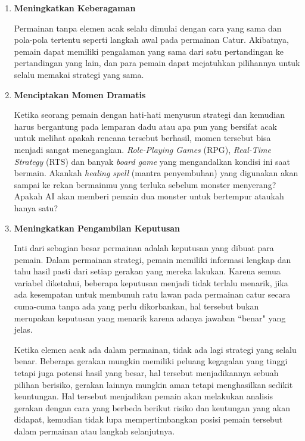 \begin{subs}
\begin{enumerate}[label=\textbf{\alph*).}]
		\item \textbf{Meningkatkan Keberagaman}
	
		Permainan tanpa elemen acak selalu dimulai dengan cara yang sama dan pola-pola tertentu seperti langkah awal pada permainan Catur. Akibatnya, pemain dapat memiliki pengalaman yang sama dari satu pertandingan ke pertandingan yang lain, dan para pemain dapat mejatuhkan pilihannya untuk selalu memakai strategi yang sama.
		\vspace{1ex}
	
		\item \textbf{Menciptakan Momen Dramatis}
	
		Ketika seorang pemain dengan hati-hati menyusun strategi dan kemudian harus bergantung pada lemparan dadu atau apa pun yang bersifat acak untuk melihat apakah rencana tersebut berhasil, momen tersebut bisa menjadi sangat menegangkan. \textit{Role-Playing Games} (RPG), \textit{Real-Time Strategy} (RTS) dan banyak \textit{board game} yang mengandalkan kondisi ini saat bermain. Akankah \textit{healing spell} (mantra penyembuhan) yang digunakan akan sampai ke rekan bermainmu yang terluka sebelum monster menyerang? Apakah AI akan memberi pemain dua monster untuk bertempur ataukah hanya satu?
		\vspace{1ex}
	
		\item \textbf{Meningkatkan Pengambilan Keputusan}
	
		Inti dari sebagian besar permainan adalah keputusan yang dibuat para pemain. Dalam permainan strategi, pemain memiliki informasi lengkap dan tahu hasil pasti dari setiap gerakan yang mereka lakukan. Karena semua variabel diketahui, beberapa keputusan menjadi tidak terlalu menarik, jika ada kesempatan untuk membunuh ratu lawan pada permainan catur secara cuma-cuma tanpa ada yang perlu dikorbankan, hal tersebut bukan merupakan keputusan yang menarik karena adanya jawaban ``benar" yang jelas.
		\vspace{1ex}
	
		Ketika elemen acak ada dalam permainan, tidak ada lagi strategi yang selalu benar. Beberapa gerakan mungkin memiliki peluang kegagalan yang tinggi tetapi juga potensi hasil yang besar, hal tersebut menjadikannya sebuah pilihan berisiko, gerakan lainnya mungkin aman tetapi menghasilkan sedikit keuntungan. Hal tersebut menjadikan pemain akan melakukan analisis gerakan dengan cara yang berbeda berikut risiko dan keutungan yang akan didapat, kemudian tidak lupa mempertimbangkan posisi pemain tersebut dalam permainan atau langkah selanjutnya.
		\vspace{1ex}
		

\end{enumerate}
\end{subs}
